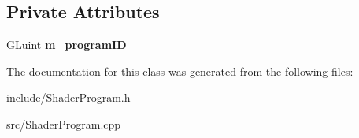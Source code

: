 \subsection*{Private Attributes}
\begin{DoxyCompactItemize}
\item 
\hypertarget{class_shader_program_ac1d443cf21df1b64bf50f137a154d9af}{G\-Luint {\bfseries m\-\_\-program\-I\-D}}\label{class_shader_program_ac1d443cf21df1b64bf50f137a154d9af}

\end{DoxyCompactItemize}


The documentation for this class was generated from the following files\-:\begin{DoxyCompactItemize}
\item 
include/Shader\-Program.\-h\item 
src/Shader\-Program.\-cpp\end{DoxyCompactItemize}
